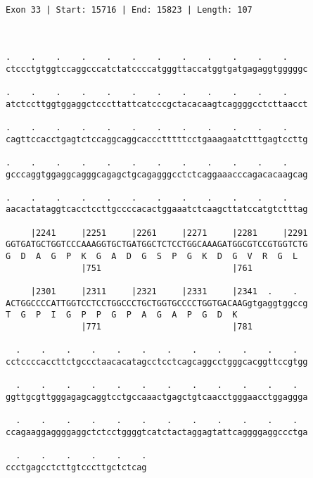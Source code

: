 \documentclass{article}
\begin{document}
\begin{Verbatim}
                                            
 
Exon 33 | Start: 15716 | End: 15823 | Length: 107



.    .    .    .    .    .    .    .    .    .    .    .    
ctccctgtggtccaggcccatctatccccatgggttaccatggtgatgagaggtgggggc
                                                            
.    .    .    .    .    .    .    .    .    .    .    .    
atctccttggtggaggctcccttattcatcccgctacacaagtcaggggcctcttaacct
                                                            
.    .    .    .    .    .    .    .    .    .    .    .    
cagttccacctgagtctccaggcaggcaccctttttcctgaaagaatctttgagtccttg
                                                            
.    .    .    .    .    .    .    .    .    .    .    .    
gcccaggtggaggcagggcagagctgcagagggcctctcaggaaacccagacacaagcag
                                                            
.    .    .    .    .    .    .    .    .    .    .    .    
aacactataggtcacctccttgccccacactggaaatctcaagcttatccatgtctttag
                                                            
     |2241     |2251     |2261     |2271     |2281     |2291
GGTGATGCTGGTCCCAAAGGTGCTGATGGCTCTCCTGGCAAAGATGGCGTCCGTGGTCTG
G  D  A  G  P  K  G  A  D  G  S  P  G  K  D  G  V  R  G  L  
               |751                          |761           
  
     |2301     |2311     |2321     |2331     |2341  .    .  
ACTGGCCCCATTGGTCCTCCTGGCCCTGCTGGTGCCCCTGGTGACAAGgtgaggtggccg
T  G  P  I  G  P  P  G  P  A  G  A  P  G  D  K              
               |771                          |781           
  
  .    .    .    .    .    .    .    .    .    .    .    .  
cctccccaccttctgccctaacacatagcctcctcagcaggcctgggcacggttccgtgg
                                                            
  .    .    .    .    .    .    .    .    .    .    .    .  
ggttgcgttgggagagcaggtcctgccaaactgagctgtcaacctgggaacctggaggga
                                                            
  .    .    .    .    .    .    .    .    .    .    .    .  
ccagaaggaggggaggctctcctggggtcatctactaggagtattcaggggaggccctga
                                                            
  .    .    .    .    .    .
ccctgagcctcttgtcccttgctctcag
                            

\end{Verbatim}
\end{document}

